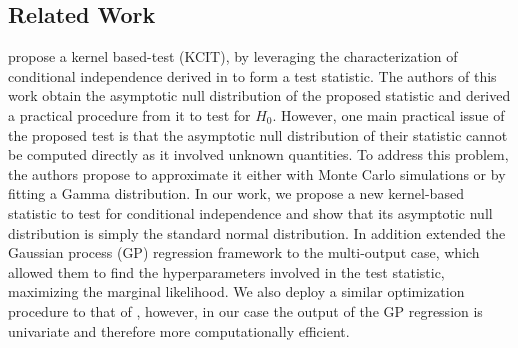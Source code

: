 \subsection{Related Work}


\citet{zhang2012kernel} propose a kernel based-test (KCIT), by leveraging the characterization of conditional independence derived in \citep{daudin1980partial} to form a test statistic. The authors of this work obtain the asymptotic null distribution of the proposed statistic and derived a practical procedure from it to test for $H_0$. However, one main practical issue of the proposed test is that the asymptotic null distribution of their statistic cannot be computed directly as it involved unknown quantities. To address this problem, the authors propose to approximate it either with Monte Carlo simulations or by fitting a Gamma distribution. In our work, we propose a new kernel-based statistic to test for conditional independence and show that its asymptotic null distribution is simply the standard normal distribution. In addition \citet{zhang2012kernel} extended the Gaussian process (GP) regression framework to the multi-output case, which allowed them to find the hyperparameters involved in the test statistic, maximizing the marginal likelihood. We also deploy a similar optimization procedure to that of \citet{zhang2012kernel}, however, in our case the output of the GP regression is univariate and therefore more computationally efficient.




